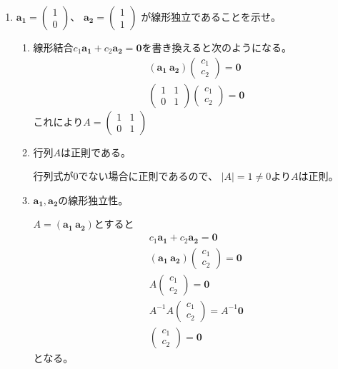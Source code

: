 \documentclass[10pt,b5paper]{ltjsarticle}
\begin{document}
\begin{enumerate}
 \item
       $\bm{a_1}=\left(\begin{matrix}1\\0\end{matrix}\right)$、
       $\bm{a_2}=\left(\begin{matrix}1\\1\end{matrix}\right)$
      が線形独立であることを示せ。
      \begin{enumerate}
       \item
            線形結合$c_1\bm{a_1}+c_2\bm{a_2}=\bm{0}$を書き換えると次のようになる。
            \begin{gather}
             \left(\bm{a_1}\ \bm{a_2}\right)
                   \left(\begin{matrix}c_1\\c_2\end{matrix}\right)=\bm{0}\\
             \left(\begin{matrix}1&1\\0&1\end{matrix}\right)
                   \left(\begin{matrix}c_1\\c_2\end{matrix}\right)=\bm{0}
            \end{gather}
            これにより$A=\left(\begin{matrix}1&1\\0&1\end{matrix}\right)$

       \item
            行列$A$は正則である。

            行列式が$0$でない場合に正則であるので、
            $\lvert A \rvert=1\ne0$より$A$は正則。

       \item
            $\bm{a_1}, \bm{a_2}$の線形独立性。

            $A=(\bm{a_1}\ \bm{a_2})$とすると
            \begin{gather}
             c_1\bm{a_1}+c_2\bm{a_2}=\bm{0}\\
             (\bm{a_1}\ \bm{a_2})\left(\begin{matrix}c_1\\c_2\end{matrix}\right)=\bm{0}\\
             A\left(\begin{matrix}c_1\\c_2\end{matrix}\right)=\bm{0}\\
             A^{-1}A\left(\begin{matrix}c_1\\c_2\end{matrix}\right)=A^{-1}\bm{0}\\
             \left(\begin{matrix}c_1\\c_2\end{matrix}\right)=\bm{0}
            \end{gather}
            となる。


\end{enumerate}
\end{enumerate}
\end{document}
